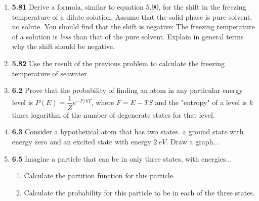 \documentclass[fleqn]{article}
\begin{document}
  \begin{enumerate}
    \item \textbf{5.81} Derive a formula, similar to equation $5.90$, for the shift in the freezing 
    temperature of a dilute solution. Assume that the solid phase is pure solvent, no solute. You should
    find that the shift is negative: The freezing temperature of a solution is \emph{less} than that
    of the pure solvent. Explain in general terms why the shift should be negative.


    \item \textbf{5.82} Use the result of the previous problem to calculate the freezing temperature
    of seawater.

    
    \item \textbf{6.2} Prove that the probability of finding an atom in any particular energy level is 
    $P(E)=\dfrac{1}{Z} e^{-F/kT}$, where $F=E-TS$ and the "entropy" of a level is $k$ times logarithm
    of the number of degenerate states for that level.


    \item \textbf{6.3} Consider a hypothetical atom that has two states. a ground state 
    with energy zero and an excited state with energy $2 ~ eV$. Draw a graph...


    \item \textbf{6.5} Imagine a particle that can be in only three states, with energies...
    \begin{enumerate}
      \item Calculate the partition function for this particle.


      \item Calculate the probability for this particle to be in each of the three states.



\end{enumerate}
\end{enumerate}
\end{document}
